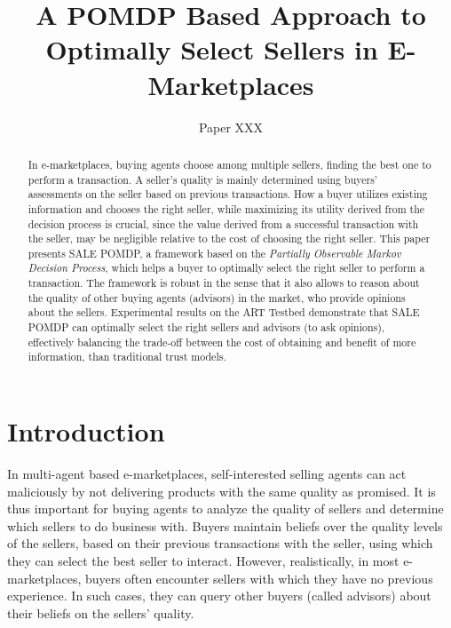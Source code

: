 \documentclass{aamas2013}
\providecommand{\SALEP}{SALE POMDP}
\begin{document}
\title{A POMDP Based Approach to Optimally Select Sellers in E-Marketplaces}

\author{Paper XXX}

\maketitle

\begin{abstract}
In e-marketplaces, buying agents choose among multiple sellers, finding the best one to perform a transaction. A seller's quality is mainly determined using buyers' assessments on the seller based on previous transactions. How a buyer utilizes existing information and chooses the right seller, while maximizing its utility derived from the decision process is crucial, since the value derived from a successful transaction with the seller, may be negligible relative to the cost of choosing the right seller. This paper presents \SALEP{}, a framework based on the \textit{Partially Observable Markov Decision Process}, which helps a buyer to optimally select the right seller to perform a transaction. The framework is robust in the sense that it also allows to reason about the quality of other buying agents (advisors) in the market, who provide opinions about the sellers. Experimental results on the ART Testbed demonstrate that \SALEP{} can optimally select the right sellers and advisors (to ask opinions), effectively balancing the trade-off between the cost of obtaining and benefit of more information, than traditional trust models.
\end{abstract}




\section{Introduction}\label{introduction}

In multi-agent based e-marketplaces, self-interested selling agents can act maliciously by not delivering products with the same quality as promised. It is thus important for buying agents to analyze the quality of sellers and determine which sellers to do business with. Buyers maintain beliefs over the quality levels of the sellers, based on their previous transactions with the seller, using which they can select the best seller to interact. However, realistically, in most e-marketplaces, buyers often encounter sellers with which they have no previous experience. In such cases, they can query other buyers (called advisors) about their beliefs on the sellers' quality.
\end{document}
